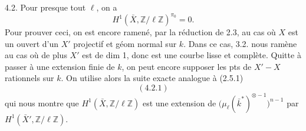   4.2. Pour presque tout $\ell$, on a
\[H^1(\bar X,\mathbb Z/\ell\mathbb Z)^{\pi_0}=0.\]
Pour prouver ceci, on est encore ramené,    par la réduction de 2.3, au cas où  $X$ est un ouvert d'un $X'$ projectif et géom normal sur $k$. Dans ce cas,  3.2. nous ramène au cas où de plus $X'$ est de dim 1, donc est une courbe lisse et complète.
Quitte à  passer à une extension finie de $k$, on peut encore supposer les pts  de $X'-X$ rationnels sur $k$. On utilise alors la suite exacte analogue à (2.5.1)
\[(4.2.1)\]
qui nous montre que $H^1(\bar X,\mathbb Z/\ell\mathbb Z)$ est une extension de $\bigl(\mu_\ell(\bar k^*)^{\otimes-1}\bigr)^{n-1}$ par $H^1(\bar X',\mathbb Z/\ell\mathbb Z)$.

